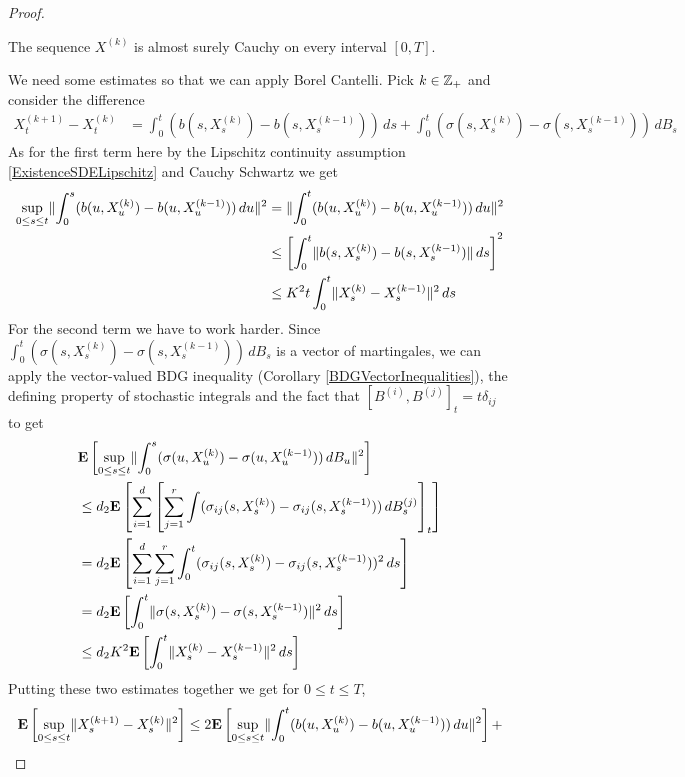 \begin{proof}
\begin{clm}The sequence $X^{(k)}$ is almost surely Cauchy on every interval $[0,T]$.
\end{clm}
We need some estimates so that we can apply Borel Cantelli.  Pick $k \in \mathbb{Z}_+$ and consider the difference
\begin{align*}
X_t^{(k+1)} - X_t^{(k)} &=
\int_0^t (b(s, X_s^{(k)}) - b(s, X_s^{(k-1)})) \, ds + \int_0^t (\sigma(s, X_s^{(k)}) - \sigma(s, X_s^{(k-1)})) \, dB_s 
\end{align*}
As for the first term here by the Lipschitz continuity assumption \eqref{ExistenceSDELipschitz} and Cauchy Schwartz we get
\begin{align*}
\sup_{0 \leq s \leq t} \lVert \int_0^s (b(u, X_u^{(k)}) - b(u, X_u^{(k-1)})) \, du \rVert^2 &=
\lVert \int_0^t (b(u, X_u^{(k)}) - b(u, X_u^{(k-1)})) \, du \rVert^2 \\
&\leq \left[\int_0^t \lVert  b(s, X_s^{(k)}) - b(s, X_s^{(k-1)}) \rVert \, ds \right]^2 \\
&\leq K^2 t \int_0^t \lVert  X_s^{(k)} - X_s^{(k-1)} \rVert^2 \, ds 
\end{align*}
For the second term we have to work harder.  Since $\int_0^t (\sigma(s, X_s^{(k)}) - \sigma(s, X_s^{(k-1)})) \, dB_s$ is a vector of martingales, we can
apply the vector-valued BDG inequality (Corollary \ref{BDGVectorInequalities}), the defining property of stochastic integrals and the fact that
$[B^{(i)}, B^{(j)}]_t = t \delta_{ij}$ to get
\begin{align*}
&\textbf{E}\left[\sup_{0 \leq s \leq t} \lVert \int_0^s (\sigma(u, X_u^{(k)}) - \sigma(u, X_u^{(k-1)})) \, dB_u \rVert^2\right]  \\
&\leq d_2 \textbf{E}\left[\sum_{i=1}^d \left[ \sum_{j=1}^r \int (\sigma_{ij}(s, X_s^{(k)}) - \sigma_{ij}(s, X_s^{(k-1)})) \, dB^{(j)}_s \right ]_t \right]  \\
&= d_2 \textbf{E}\left[\sum_{i=1}^d \sum_{j=1}^r \int_0^t (\sigma_{ij}(s, X_s^{(k)}) - \sigma_{ij}(s, X_s^{(k-1)}))^2 \, ds  \right]  \\
&= d_2 \textbf{E}\left[\int_0^t \lVert \sigma(s, X_s^{(k)}) - \sigma(s, X_s^{(k-1)}) \rVert^2 \, ds  \right]  \\
&\leq d_2 K^2 \textbf{E}\left[\int_0^t \lVert X_s^{(k)} - X_s^{(k-1)} \rVert^2 \, ds  \right]  \\
\end{align*}
Putting these two estimates together we get for $0 \leq t \leq T$, 
\begin{align*}
\expectation{\sup_{0 \leq s \leq t} \norm{X_s^{(k+1)} - X_s^{(k)}}^2} 
&\leq 2 \expectation{\sup_{0 \leq s \leq t}\norm{\int_0^t (b(u, X_u^{(k)}) - b(u, X_u^{(k-1)})) \, du}^2} + \\

\end{align*}
\end{proof}
